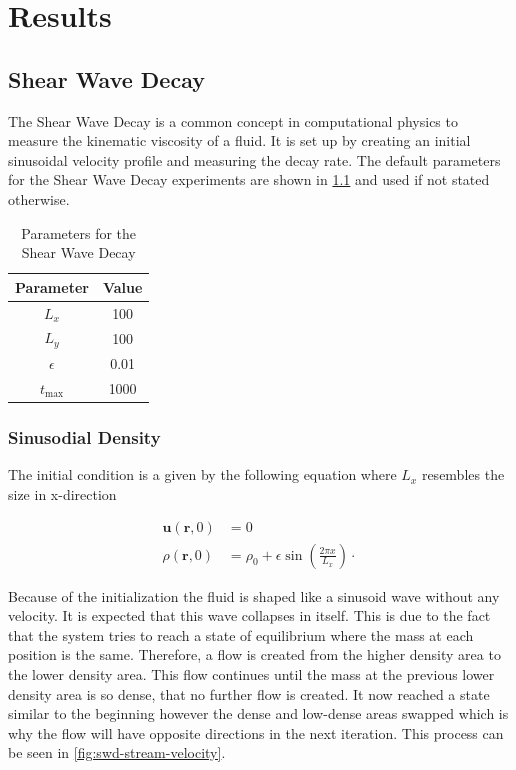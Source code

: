 \chapter{Results}


\section{Shear Wave Decay}
The Shear Wave Decay is a common concept in computational physics to measure the kinematic viscosity of a fluid.
It is set up by creating an initial sinusoidal velocity profile and measuring the decay rate.
The default parameters for the Shear Wave Decay experiments are shown in \cref{tab:swd-parameters} and used if not stated otherwise.

\begin{table}[ht]
    \centering %
    \begin{tabular}{c c}
        \hline\hline %
        Parameter  & Value \\ [0.5ex] %
        \hline %
        $L_x$      & 100   \\
        $L_y$      & 100   \\
        $\epsilon$ & 0.01  \\
        $t_{\max}$ & 1000  \\ [1ex] %
        \hline %
    \end{tabular}
    \caption{Parameters for the Shear Wave Decay} %
    \label{tab:swd-parameters}
\end{table}

\subsection{Sinusodial Density}
The initial condition is a given by the following equation where $L_x$ resembles the size in x-direction

\begin{equation*}
    \begin{aligned}
        \mathbf{u}(\mathbf{r},0) &= 0 \\
        \rho(\mathbf{r},0) &= \rho_0 + \epsilon \sin \left( \frac{2 \pi x}{L_x} \right) \cdot
    \end{aligned}
\end{equation*}

Because of the initialization the fluid is shaped like a sinusoid wave without any velocity.
It is expected that this wave collapses in itself.
This is due to the fact that the system tries to reach a state of equilibrium where the mass at each position is the same.
Therefore, a flow is created from the higher density area to the lower density area.
This flow continues until the mass at the previous lower density area is so dense, that no further flow is created. %
It now reached a state similar to the beginning however the dense and low-dense areas swapped which is why the flow will have opposite directions in the next iteration.
This process can be seen in \cref{fig:swd-stream-velocity}. %

